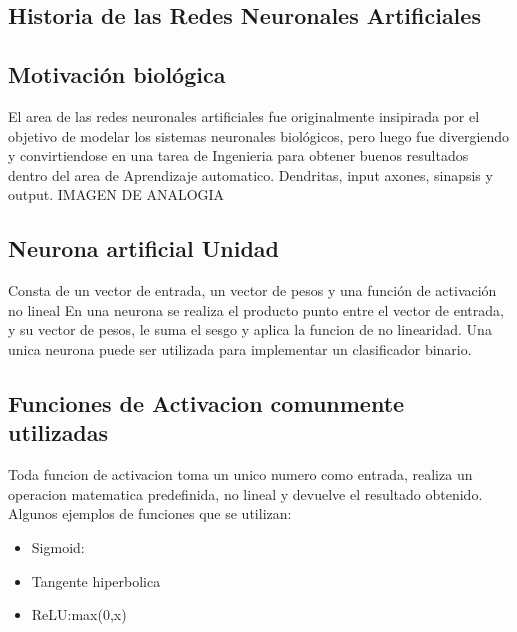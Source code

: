 \documentclass[a4paper,11pt,spanish]{book}
\begin{document}
      \subsection {Historia de las Redes Neuronales Artificiales}
      
      \subsection {Motivación biológica} 
	El area de las redes neuronales artificiales fue originalmente insipirada por el objetivo de modelar los sistemas neuronales biológicos, 
	pero luego fue divergiendo
	y convirtiendose en una tarea de Ingenieria para obtener buenos resultados dentro del area de Aprendizaje automatico.
	Dendritas, input axones, sinapsis y output.
	IMAGEN DE ANALOGIA

      \subsection {Neurona artificial Unidad}
	Consta de un vector de entrada, un vector de pesos y una función de activación no lineal
	En una neurona se realiza el producto punto entre el vector de entrada, y su vector de pesos, le suma el sesgo y aplica la funcion de no linearidad.
	Una unica neurona puede ser utilizada para implementar un clasificador binario.

      \subsection {Funciones de Activacion comunmente utilizadas}
	Toda funcion de activacion toma un unico numero como entrada, realiza un operacion matematica predefinida, no lineal y devuelve el resultado obtenido.
	Algunos ejemplos de funciones que se utilizan:
	\begin{itemize}
	  \item Sigmoid:
	  \item Tangente hiperbolica
	  \item ReLU:max(0,x)
	\end{itemize}
\end{document}

